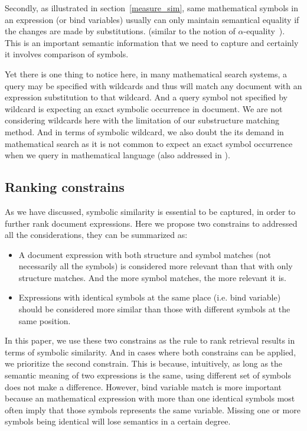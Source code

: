 Secondly, as illustrated in section~\ref{measure_sim}, same mathematical symbols in an expression (or bind variables) usually can only maintain semantical equality if the changes are made by substitutions. (similar to the notion of $\alpha$-equality~\cite{Hindley1986}). This is an important semantic information that we need to capture and certainly it involves comparison of symbols. 

Yet there is one thing to notice here, in many mathematical search systems, a query may be specified with wildcards and thus will match any document with an expression substitution to that wildcard. 
And a query symbol not specified by wildcard is expecting an exact symbolic occurrence in document.
We are not considering wildcards here with the limitation of our substructure matching method. 
And in terms of symbolic wildcard, we also doubt the its demand in mathematical search as it is not common to expect an exact symbol occurrence when we query in mathematical language (also addressed in \cite{mias11a}).

\subsection{Ranking constrains}
As we have discussed, symbolic similarity is essential to be captured, in order to further rank document expressions. 
Here we propose two constrains to addressed all the considerations, they can be summarized as:

\begin{itemize}
\item A document expression with both structure and symbol matches (not necessarily all the symbols) is considered more relevant than that with only structure matches. 
And the more symbol matches, the more relevant it is.
\item Expressions with identical symbols at the same place (i.e. bind variable) should be considered more similar than those with different symbols at the same position. 
\end{itemize}

In this paper, we use these two constrains as the rule to rank retrieval results in terms of symbolic similarity.
And in cases where both constrains can be applied, we prioritize the second constrain. 
This is because, intuitively, as long as the semantic meaning of two expressions is the same, using different set of symbols does not make a difference. 
However, bind variable match is more important because an mathematical expression with more than one identical symbols most often imply that those symbols represents the same variable. 
Missing one or more symbols being identical will lose semantics in a certain degree.

